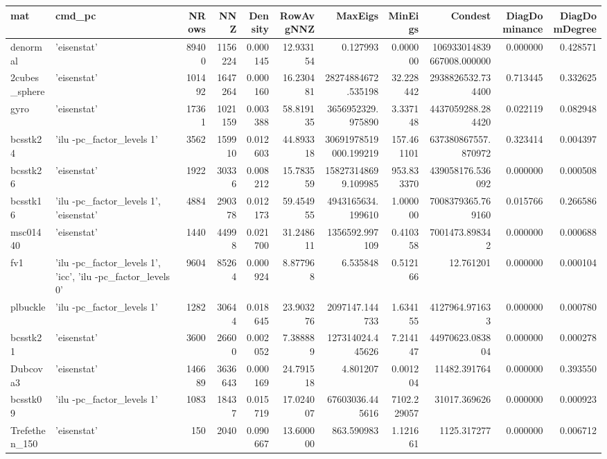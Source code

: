 \begin{tabular}{llrrrrrrrrr}
\toprule
mat & cmd\_pc & NRows & NNZ & Density & RowAvgNNZ & MaxEigs & MinEigs & Condest & DiagDominance & DiagDomDegree \\
\midrule
denormal & {'eisenstat'} & 89400 & 1156224 & 0.000145 & 12.933154 & 0.127993 & 0.000000 & 106933014839667008.000000 & 0.000000 & 0.428571 \\
2cubes\_sphere & {'eisenstat'} & 101492 & 1647264 & 0.000160 & 16.230481 & 28274884672.535198 & 32.228442 & 2938826532.734400 & 0.713445 & 0.332625 \\
gyro & {'eisenstat'} & 17361 & 1021159 & 0.003388 & 58.819135 & 3656952329.975890 & 3.337148 & 4437059288.284420 & 0.022119 & 0.082948 \\
bcsstk24 & {'ilu -pc\_factor\_levels 1'} & 3562 & 159910 & 0.012603 & 44.893318 & 30691978519000.199219 & 157.461101 & 637380867557.870972 & 0.323414 & 0.004397 \\
bcsstk26 & {'eisenstat'} & 1922 & 30336 & 0.008212 & 15.783559 & 158273148699.109985 & 953.833370 & 439058176.536092 & 0.000000 & 0.000508 \\
bcsstk16 & {'ilu -pc\_factor\_levels 1', 'eisenstat'} & 4884 & 290378 & 0.012173 & 59.454955 & 4943165634.199610 & 1.000000 & 7008379365.769160 & 0.015766 & 0.266586 \\
msc01440 & {'eisenstat'} & 1440 & 44998 & 0.021700 & 31.248611 & 1356592.997109 & 0.410358 & 7001473.898342 & 0.000000 & 0.000688 \\
fv1 & {'ilu -pc\_factor\_levels 1', 'icc', 'ilu -pc\_factor\_levels 0'} & 9604 & 85264 & 0.000924 & 8.877968 & 6.535848 & 0.512166 & 12.761201 & 0.000000 & 0.000104 \\
plbuckle & {'ilu -pc\_factor\_levels 1'} & 1282 & 30644 & 0.018645 & 23.903276 & 2097147.144733 & 1.634155 & 4127964.971633 & 0.000000 & 0.000780 \\
bcsstk21 & {'eisenstat'} & 3600 & 26600 & 0.002052 & 7.388889 & 127314024.445626 & 7.214147 & 44970623.083804 & 0.000000 & 0.000278 \\
Dubcova3 & {'eisenstat'} & 146689 & 3636643 & 0.000169 & 24.791518 & 4.801207 & 0.001204 & 11482.391764 & 0.000000 & 0.393550 \\
bcsstk09 & {'ilu -pc\_factor\_levels 1'} & 1083 & 18437 & 0.015719 & 17.024007 & 67603036.445616 & 7102.229057 & 31017.369626 & 0.000000 & 0.000923 \\
Trefethen\_150 & {'eisenstat'} & 150 & 2040 & 0.090667 & 13.600000 & 863.590983 & 1.121661 & 1125.317277 & 0.000000 & 0.006712 \\

\end{tabular}
